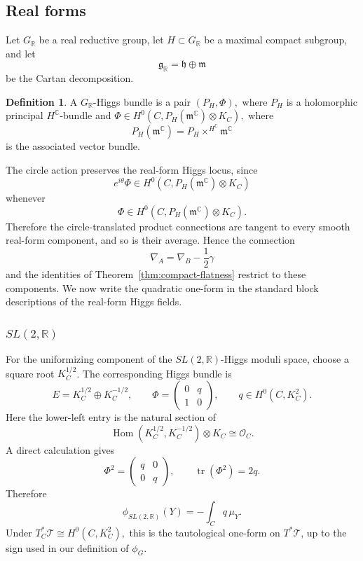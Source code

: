 \documentclass[11pt,reqno]{amsart}
\numberwithin{equation}{section}
\theoremstyle{plain}
\theoremstyle{definition}
\newtheorem{definition}[theorem]{Definition}
\theoremstyle{remark}
\begin{document}
\subsection{Real forms}

Let \(G_{\mathbb R}\) be a real reductive group, let
\(
        H\subset G_{\mathbb R}
\)
be a maximal compact subgroup, and let
\[
        \mathfrak g_{\mathbb R}
        =
        \mathfrak h\oplus\mathfrak m
\]
be the Cartan decomposition.  
\begin{definition}
A \(G_{\mathbb R}\)-Higgs bundle is a pair
\(
        (P_H,\Phi),
\)
where \(P_H\) is a holomorphic principal \(H^{\mathbb C}\)-bundle and
\(
        \Phi\in H^0(C,P_H(\mathfrak m^{\mathbb C})\otimes K_C),
\)
where
\[
        P_H(\mathfrak m^{\mathbb C})
        =
        P_H\times^{H^{\mathbb C}}\mathfrak m^{\mathbb C}
\]
is the associated vector bundle.
\end{definition}

The circle action preserves the real-form Higgs locus, since
\[
        e^{i\theta}\Phi
        \in H^0(C,P_H(\mathfrak m^{\mathbb C})\otimes K_C)
\]
whenever
\[
        \Phi\in H^0(C,P_H(\mathfrak m^{\mathbb C})\otimes K_C).
\]
Therefore the circle-translated product connections are tangent to every smooth
real-form component, and so is their average. Hence the connection
\[
        \nabla_A=\nabla_B-\frac12\gamma
\]
and the identities of Theorem~\ref{thm:compact-flatness} restrict to these
components. We now write the quadratic one-form in the standard block
descriptions of the real-form Higgs fields.

\subsubsection{\texorpdfstring{\(SL(2,\mathbb R)\)}{SL(2,R)}}

For the uniformizing component of the \(SL(2,\mathbb R)\)-Higgs moduli space,
choose a square root \(K_C^{1/2}\). The corresponding Higgs bundle is
\[
        E=K_C^{1/2}\oplus K_C^{-1/2},
        \qquad
        \Phi=
        \begin{pmatrix}
        0&q\\
        1&0
        \end{pmatrix},
        \qquad
        q\in H^0(C,K_C^2).
\]
Here the lower-left entry is the natural section of
\[
        \operatorname{Hom}(K_C^{1/2},K_C^{-1/2})\otimes K_C
        \cong
        \mathcal O_C.
\]
A direct calculation gives
\[
        \Phi^2=
        \begin{pmatrix}
        q&0\\
        0&q
        \end{pmatrix},
        \qquad
        \operatorname{tr}(\Phi^2)=2q.
\]
Therefore
\[
        \phi_{SL(2,\mathbb R)}(Y)
        =
        -\int_C q\,\mu_Y.
\]
Under
\(
        T_C^*\mathcal T\cong H^0(C,K_C^2),
\)
this is the tautological one-form on \(T^*\mathcal T\), up to the sign used in
our definition of \(\phi_G\).
\end{document}
